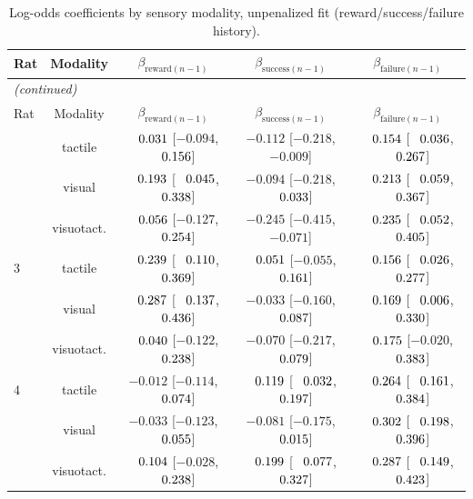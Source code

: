 \begin{longtable}{lcccc}
\caption{Log-odds coefficients by sensory modality, unpenalized fit (reward/success/failure history).}
\label{tab:table2b_modality_coeffs} \\
\toprule
Rat & Modality & $\beta_{\mathrm{reward}(n-1)}$ & $\beta_{\mathrm{success}(n-1)}$ & $\beta_{\mathrm{failure}(n-1)}$ \\
\midrule
\endfirsthead
\multicolumn{5}{l}{\textit{(continued)}} \\
\toprule
Rat & Modality & $\beta_{\mathrm{reward}(n-1)}$ & $\beta_{\mathrm{success}(n-1)}$ & $\beta_{\mathrm{failure}(n-1)}$ \\
\midrule
\endhead
\bottomrule
\endfoot
\bottomrule
\endlastfoot
2 & tactile & $\hphantom{-}0.031$ [$-0.094$, $\hphantom{-}0.156$] & $-0.112$ [$-0.218$, $-0.009$] & $\hphantom{-}0.154$ [$\hphantom{-}0.036$, $\hphantom{-}0.267$] \\
 & visual & $\hphantom{-}0.193$ [$\hphantom{-}0.045$, $\hphantom{-}0.338$] & $-0.094$ [$-0.218$, $\hphantom{-}0.033$] & $\hphantom{-}0.213$ [$\hphantom{-}0.059$, $\hphantom{-}0.367$] \\
 & visuotact. & $\hphantom{-}0.056$ [$-0.127$, $\hphantom{-}0.254$] & $-0.245$ [$-0.415$, $-0.071$] & $\hphantom{-}0.235$ [$\hphantom{-}0.052$, $\hphantom{-}0.405$] \\
\midrule
3 & tactile & $\hphantom{-}0.239$ [$\hphantom{-}0.110$, $\hphantom{-}0.369$] & $\hphantom{-}0.051$ [$-0.055$, $\hphantom{-}0.161$] & $\hphantom{-}0.156$ [$\hphantom{-}0.026$, $\hphantom{-}0.277$] \\
 & visual & $\hphantom{-}0.287$ [$\hphantom{-}0.137$, $\hphantom{-}0.436$] & $-0.033$ [$-0.160$, $\hphantom{-}0.087$] & $\hphantom{-}0.169$ [$\hphantom{-}0.006$, $\hphantom{-}0.330$] \\
 & visuotact. & $\hphantom{-}0.040$ [$-0.122$, $\hphantom{-}0.238$] & $-0.070$ [$-0.217$, $\hphantom{-}0.079$] & $\hphantom{-}0.175$ [$-0.020$, $\hphantom{-}0.383$] \\
\midrule
4 & tactile & $-0.012$ [$-0.114$, $\hphantom{-}0.074$] & \cellcolor{gray!15}$\hphantom{-}0.119$ [$\hphantom{-}0.032$, $\hphantom{-}0.197$] & $\hphantom{-}0.264$ [$\hphantom{-}0.161$, $\hphantom{-}0.384$] \\
 & visual & $-0.033$ [$-0.123$, $\hphantom{-}0.055$] & \cellcolor{gray!15}$-0.081$ [$-0.175$, $\hphantom{-}0.015$] & $\hphantom{-}0.302$ [$\hphantom{-}0.198$, $\hphantom{-}0.396$] \\
 & visuotact. & $\hphantom{-}0.104$ [$-0.028$, $\hphantom{-}0.238$] & \cellcolor{gray!15}$\hphantom{-}0.199$ [$\hphantom{-}0.077$, $\hphantom{-}0.327$] & $\hphantom{-}0.287$ [$\hphantom{-}0.149$, $\hphantom{-}0.423$] \\

\end{longtable}
